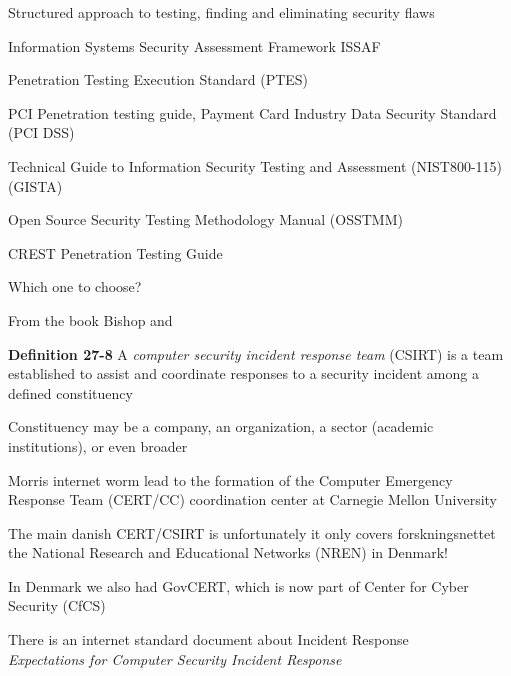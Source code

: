 \documentclass[Screen16to9,17pt]{foils}
\begin{document}


\begin{list2}
\item Structured approach to testing, finding and eliminating security flaws
\item Information Systems Security Assessment Framework ISSAF
\item Penetration Testing Execution Standard (PTES)
\item PCI Penetration testing guide, Payment Card Industry Data Security Standard (PCI DSS)
\item Technical Guide to Information Security Testing and Assessment (NIST800-115) (GISTA)
\item Open Source Security Testing Methodology Manual (OSSTMM)
\item CREST Penetration Testing Guide
\end{list2}

Which one to choose?

From the book Bishop and 





\begin{list2}
\item {\bf Definition 27-8} A \emph{computer security incident response team} (CSIRT) is a team established to assist and coordinate responses to a security incident among a defined constituency
\item Constituency may be a company, an organization, a sector (academic institutions), or even broader
\item Morris internet worm lead to the formation of the Computer Emergency Response Team (CERT/CC) coordination center at Carnegie Mellon University \\
\item The main danish CERT/CSIRT is  unfortunately it only covers forskningsnettet the National Research and Educational Networks (NREN) in Denmark!
\item In Denmark we also had GovCERT, which is now part of Center for Cyber Security (CfCS)
\item There is an internet standard document about Incident Response\\
\emph{Expectations for Computer Security Incident Response
}
\end{list2}
\end{document}

